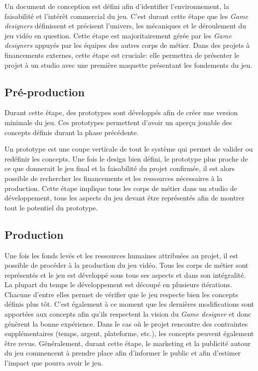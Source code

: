 Un document de conception est défini afin d'identifier l'environnement, la faisabilité et l'intérêt commercial du jeu.
C'est durant cette étape que les \emph{Game designers} définissent et précisent l'univers, les mécaniques et le déroulement du jeu vidéo en question.
Cette étape est majoritairement gérée par les \emph{Game designers} appuyés par les équipes des autres corps de métier.
Dans des projets à financements externes, cette étape est cruciale: elle permettra de présenter le projet à un studio avec une première maquette présentant les fondements du jeu.

\subsection{Pré-production}
Durant cette étape, des prototypes sont développés afin de créer une version minimale du jeu.
Ces prototypes permettent d'avoir un aperçu jouable des concepts définis durant la phase précédente. 

Un prototype est une coupe verticale de tout le système qui permet de valider ou redéfinir les concepts.
Une fois le design bien défini, le prototype plus proche de ce que donnerait le jeu final et la faisabilité du projet confirmée, il est alors possible de rechercher les financements et les ressources nécessaires à la production.
Cette étape implique tous les corps de métier dans un studio de développement, tous les aspects du jeu devant être représentés afin de montrer tout le potentiel du prototype.

\subsection{Production}
Une fois les fonds levés et les ressources humaines attribuées au projet, il est possible de procéder à la production du jeu vidéo.
Tous les corps de métier sont représentés et le jeu est développé sous tous ses aspects et dans son intégralité.
La plupart du temps le développement est découpé en plusieurs itérations.
Chacune d'entre elles permet de vérifier que le jeu respecte bien les concepts définis plus tôt.
C'est également à ce moment que les dernières modifications sont apportées aux concepts afin qu'ils respectent la vision du \emph{Game designer} et donc génèrent la bonne expérience.
Dans le cas o\`u le projet rencontre des contraintes supplémentaires (temps, argent, plateforme, etc.), les concepts peuvent également être revus.
Généralement, durant cette étape, le marketing et la publicité autour du jeu commencent à prendre place afin d'informer le public et afin d'estimer l'impact que pourra avoir le jeu.

